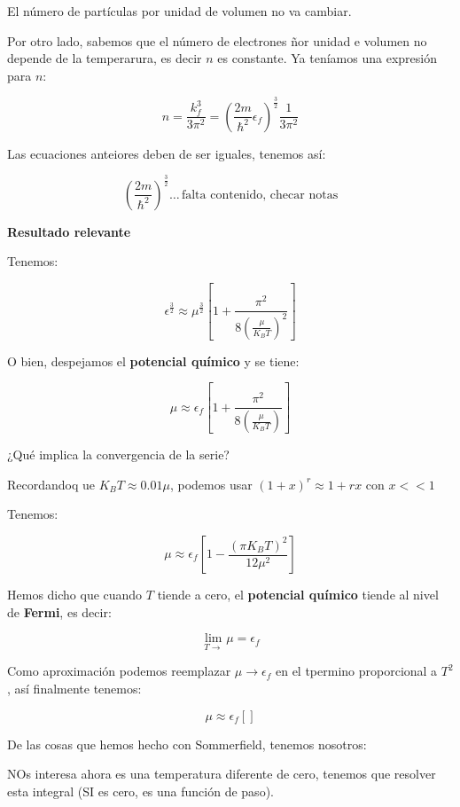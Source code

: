 \documentclass{article}
\begin{document}
El número de partículas por unidad de volumen no va cambiar.


Por otro lado, sabemos que el número de electrones ñor unidad e volumen no depende de la temperarura, es decir $n$ es constante. Ya teníamos una expresión para $n$:



\[   n = \frac{  k^{3}_{f} }{3\pi^{2}} = \left(  \frac{2m}{\hbar^{2}}\epsilon_{f}  \right)^{\frac{3}{2}} \frac{1}{3\pi^{2}} \]


Las ecuaciones anteiores deben de ser iguales, tenemos así:


\[   \left(   \frac{2m}{\hbar^{2}}  \right)^{\frac{3}{2}} \ldots \, \text{falta contenido, checar notas}     \]


\textbf{Resultado relevante}


Tenemos:


\[ \epsilon^{\frac{3}{2}}  \approx \mu^{\frac{3}{2}}  \left[  1 + \frac{ \pi^{2}  }{  8 \left(   \frac{\mu}{  K_{B}T } \right)^{2} }    \right] \]




O bien, despejamos el \textbf{potencial químico} y se tiene: 


\[  \mu \approx \epsilon_{f}  \left[  1 + \frac{ \pi^{2}  }{ 8 \left( \frac{\mu}{ K_{B}T  }   \right) }  \right]  \]

¿Qué implica la convergencia de la serie?


Recordandoq ue $K_{B}T \approx 0\text{.}01\mu$, podemos usar $(1+x)^{r}\approx 1+rx$ con $x<<1$


Tenemos:



\[ \mu \approx \epsilon_{f} \left[1 - \frac{  (\pi K_{B}T)^{2}  }{12\mu^{2}}    \right]   \]


Hemos dicho que cuando $T$ tiende a cero, el \textbf{potencial químico} tiende al nivel de \textbf{Fermi}, es decir:


\[   \lim\limits_{T \to } \mu = \epsilon_{f} \]

Como aproximación podemos reemplazar $\mu \to \epsilon_{f}$ en el tpermino proporcional a $T^{2}$,  así finalmente tenemos:


\[ \mu \approx \epsilon_{f} \left[    \right]  \]



De las cosas que hemos hecho con Sommerfield, tenemos nosotros:


NOs interesa ahora es una temperatura diferente de cero, tenemos que resolver esta integral (SI es cero, es una función de paso).
\end{document}
